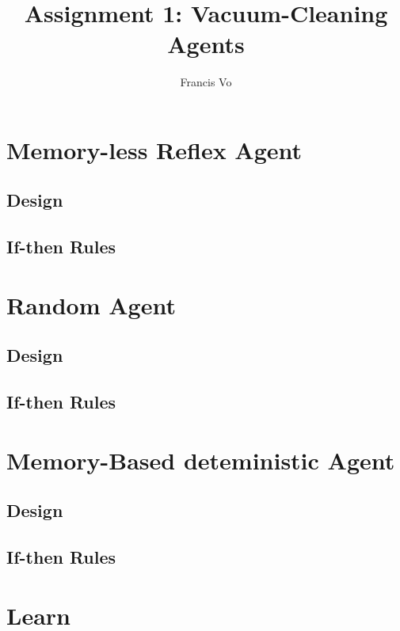 \documentclass[a4paper,10pt]{article}
\title{Assignment 1: Vacuum-Cleaning Agents}
\author{Francis Vo}
\begin{document}
\maketitle

\section{Memory-less Reflex Agent}
\subsection{Design}
\subsection{If-then Rules}

\section{Random Agent}
\subsection{Design}
\subsection{If-then Rules}

\section{Memory-Based deteministic Agent}
\subsection{Design}

\subsection{If-then Rules}

\section{Learn}
\end{document}
